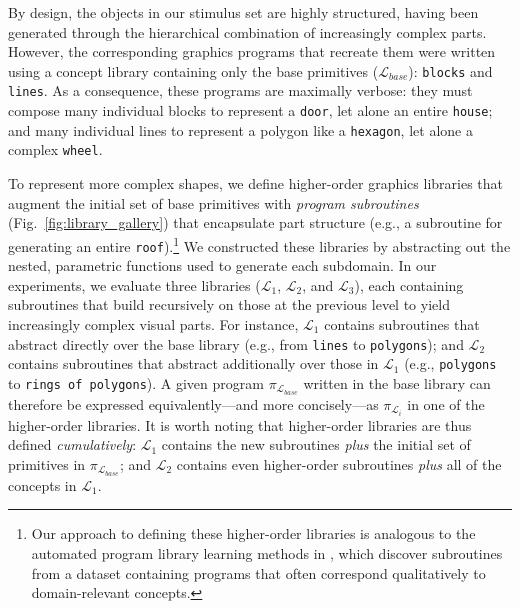 By design, the objects in our stimulus set are highly structured, having been generated through the hierarchical combination of increasingly complex parts.
However, the corresponding graphics programs that recreate them were written using a concept library containing only the base primitives ($\mathcal{L}_{base}$): \texttt{blocks} and \texttt{lines}.
As a consequence, these programs are maximally verbose: they must compose many individual blocks to represent a \texttt{door}, let alone an entire \texttt{house}; and many individual lines to represent a polygon like a \texttt{hexagon}, let alone a complex \texttt{wheel}. 

To represent more complex shapes, we define higher-order graphics libraries that augment the initial set of base primitives with \textit{program subroutines} (Fig.~\ref{fig:library_gallery}) that encapsulate part structure (e.g., a subroutine for generating an entire \texttt{roof}).\footnote{Our approach to defining these higher-order libraries is analogous to the automated program library learning methods in , which discover subroutines from a dataset containing programs that often correspond qualitatively to domain-relevant concepts.}
We constructed these libraries by abstracting out the nested, parametric functions used to generate each subdomain. 
In our experiments, we evaluate three libraries ($\mathcal{L}_1$, $\mathcal{L}_2$, and $\mathcal{L}_3$), each containing subroutines that build recursively on those at the previous level to yield increasingly complex visual parts.
For instance, $\mathcal{L}_1$ contains subroutines that abstract directly over the base library (e.g., from \texttt{lines} to \texttt{polygons}); and $\mathcal{L}_2$ contains subroutines that abstract additionally over those in $\mathcal{L}_1$ (e.g., \texttt{polygons} to \texttt{rings of polygons}). 
A given program $\pi_{\mathcal{L}_{base}}$ written in the base library can therefore be expressed equivalently---and more concisely---as $\pi_{\mathcal{L}_{i}}$ in one of the higher-order libraries. 
It is worth noting that higher-order libraries are thus defined \textit{cumulatively}:
$\mathcal{L}_1$ contains the new subroutines \textit{plus} the initial set of primitives in $\pi_{\mathcal{L}_{base}}$; and $\mathcal{L}_2$ contains even higher-order subroutines \textit{plus} all of the concepts in $\mathcal{L}_1$.

